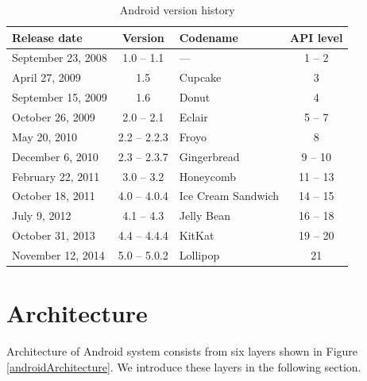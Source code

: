 \begin {table}[h!]
    \begin{tabular}{|l|c|l|c|}
    \hline
    {\bf Release date}  & {\bf Version} & {\bf Codename}        & {\bf API level}   \\
    \hline \hline
    September 23, 2008  & 1.0 -- 1.1    & ---                   & 1 -- 2            \\
    \hline
    April 27, 2009      & 1.5           & Cupcake               & 3                 \\
    \hline
    September 15, 2009  & 1.6           & Donut                 & 4                 \\
    \hline
    October 26, 2009    & 2.0 -- 2.1    & Eclair                & 5 -- 7            \\
    \hline
    May 20, 2010        & 2.2 -- 2.2.3  & Froyo                 & 8                 \\
    \hline
    December 6, 2010    & 2.3 -- 2.3.7  & Gingerbread           & 9 -- 10           \\
    \hline
    February 22, 2011   & 3.0 -- 3.2    & Honeycomb             & 11 -- 13          \\
    \hline
    October 18, 2011    & 4.0 -- 4.0.4  & Ice Cream Sandwich    & 14 -- 15          \\
    \hline
    July 9, 2012        & 4.1 -- 4.3    & Jelly Bean            & 16 -- 18          \\
    \hline
    October 31, 2013    & 4.4 -- 4.4.4  & KitKat                & 19 -- 20          \\
    \hline
    November 12, 2014   & 5.0 -- 5.0.2  & Lollipop              & 21                \\
    \hline
    \end{tabular}
    \centering
    \caption{Android version history}
    \label{androidHistory}
\end{table}

\section{Architecture}
Architecture of Android system consists from six layers shown in Figure \ref{androidArchitecture}. We introduce these layers in the following section.

